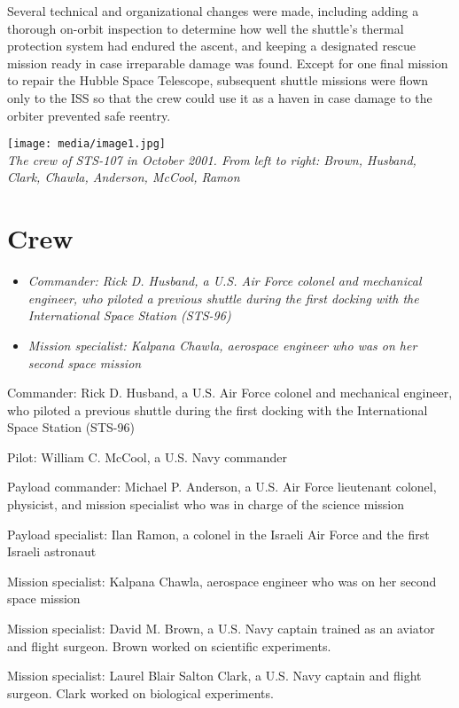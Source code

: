 Several technical and organizational changes were made, including adding
a thorough on-orbit inspection to determine how well the shuttle's
thermal protection system had endured the ascent, and keeping a
designated rescue mission ready in case irreparable damage was found.
Except for one final mission to repair the Hubble Space Telescope,
subsequent shuttle missions were flown only to the ISS so that the crew
could use it as a haven in case damage to the orbiter prevented safe
reentry.

\texttt{[image: media/image1.jpg]}\\
\emph{The crew of STS-107 in October 2001. From left to right: Brown,
Husband, Clark, Chawla, Anderson, McCool, Ramon}

\section{Crew}\label{crew}

\begin{itemize}
\item
  \emph{Commander: Rick D. Husband, a U.S. Air Force colonel and
  mechanical engineer, who piloted a previous shuttle during the first
  docking with the International Space Station (STS-96)}
\item
  \emph{Mission specialist: Kalpana Chawla, aerospace engineer who was
  on her second space mission}
\end{itemize}

Commander: Rick D. Husband, a U.S. Air Force colonel and mechanical
engineer, who piloted a previous shuttle during the first docking with
the International Space Station (STS-96)

Pilot: William C. McCool, a U.S. Navy commander

Payload commander: Michael P. Anderson, a U.S. Air Force lieutenant
colonel, physicist, and mission specialist who was in charge of the
science mission

Payload specialist: Ilan Ramon, a colonel in the Israeli Air Force and
the first Israeli astronaut

Mission specialist: Kalpana Chawla, aerospace engineer who was on her
second space mission

Mission specialist: David M. Brown, a U.S. Navy captain trained as an
aviator and flight surgeon. Brown worked on scientific experiments.

Mission specialist: Laurel Blair Salton Clark, a U.S. Navy captain and
flight surgeon. Clark worked on biological experiments.

